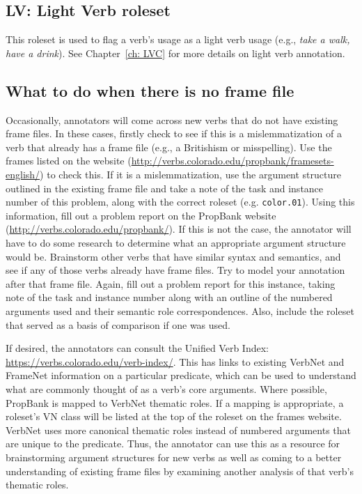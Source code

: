 \documentclass[11pt]{report}
\begin{document}
\subsection{LV: Light Verb roleset}
This roleset is used to flag a verb's usage as a light verb usage (e.g., \textit{take a walk, have a drink}).  See Chapter~\ref{ch: LVC} for more details on light verb annotation. 

\subsection{What to do when there is no frame file}
Occasionally, annotators will come across new verbs that do not have existing frame files. In these cases, firstly check to see if this is a mislemmatization of a verb that already has a frame file (e.g., a Britishism or misspelling). Use the frames listed on the website (\url{http://verbs.colorado.edu/propbank/framesets-english/}) to check this. If it is a mislemmatization, use the argument structure outlined in the existing frame file and take a note of the task and instance number of this problem, along with the correct roleset (e.g. \texttt{color.01}).  Using this information, fill out a problem report on the PropBank website (\url{http://verbs.colorado.edu/propbank/}). If this is not the case, the annotator will have to do some research to determine what an appropriate argument structure would be.  Brainstorm other verbs that have similar syntax and semantics, and see if any of those verbs already have frame files.  Try to model your annotation after that frame file. Again, fill out a problem report for this instance, taking note of the task and instance number along with an outline of the numbered arguments used and their semantic role correspondences. Also, include the roleset that served as a basis of comparison if one was used.  

If desired, the annotators can consult the Unified Verb Index: \url{https://verbs.colorado.edu/verb-index/}.  This has links to existing VerbNet and FrameNet information on a particular predicate, which can be used to understand what are commonly thought of as a verb's core arguments.  Where possible, PropBank is mapped to VerbNet thematic roles.  If a mapping is appropriate, a roleset's VN class will be listed at the top of the roleset on the frames website.  VerbNet uses more canonical thematic roles instead of numbered arguments that are unique to the predicate.  Thus, the annotator can use this as a resource for brainstorming argument structures for new verbs as well as coming to a better understanding of existing frame files by examining another analysis of that verb's thematic roles.  
\end{document}
